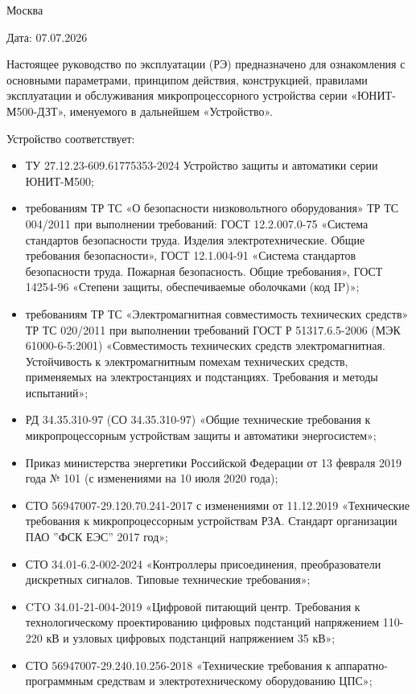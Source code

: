 \documentclass[a4paper, 12pt, table, hidelinks, DIV=calc]{extarticle}
\def\revdate{07.07.2026}
\def\colondevicetype{ЮНИТ-М500-ДЗТ}
\begin{document}
\vskip 3mm
\noindent
Москва
\hfill
\parbox{0.3\textwidth}{\raggedleft Дата: \textcolor{unigray}{\revdate}}
\vskip 5mm

\par
Настоящее руководство по эксплуатации (РЭ) предназначено для ознакомления с основными параметрами, принципом действия, конструкцией, правилами эксплуатации и обслуживания микропроцессорного устройства серии «\colondevicetype», именуемого в дальнейшем «Устройство».

\par
Устройство соответствует:
\begin{itemize}
\item ТУ 27.12.23-609.61775353-2024 Устройство защиты и автоматики серии ЮНИТ-М500;
\item требованиям ТР ТС «О безопасности низковольтного оборудования» ТР ТС 004/2011 при выполнении требований: ГОСТ 12.2.007.0-75 «Система стандартов безопасности труда. Изделия электротехнические. Общие требования безопасности», ГОСТ 12.1.004-91 «Система стандартов безопасности труда. Пожарная безопасность. Общие требования», ГОСТ 14254-96 «Степени защиты, обеспечиваемые оболочками (код IP)»; 
\item требованиям ТР ТС «Электромагнитная совместимость технических средств» ТР ТС 020/2011 при выполнении требований ГОСТ Р 51317.6.5-2006 (МЭК 61000-6-5:2001) «Совместимость технических средств электромагнитная. Устойчивость к электромагнитным помехам технических средств, применяемых на электростанциях и подстанциях. Требования и методы испытаний»;
\item РД 34.35.310-97 (СО 34.35.310-97) «Общие технические требования к микропроцессорным устройствам защиты и автоматики энергосистем»;
\item Приказ министерства энергетики Российской Федерации от 13 февраля 2019 года № 101 (с изменениями на 10 июля 2020 года);
\item СТО 56947007-29.120.70.241-2017 с изменениями от 11.12.2019 «Технические требования к микропроцессорным устройствам РЗА. Стандарт организации ПАО ''ФСК ЕЭС'' 2017 год»;
\item СТО 34.01-6.2-002-2024 «Контроллеры присоединения, преобразователи дискретных сигналов. Типовые технические требования»;
\item CTO 34.01-21-004-2019 «Цифровой питающий центр. Требования к технологическому проектированию цифровых подстанций напряжением 110-220 кВ и узловых цифровых подстанций напряжением 35 кВ»;
\item СТО 56947007-29.240.10.256-2018 «Технические требования к аппаратно-программным средствам и электротехническому оборудованию ЦПС»;

\end{itemize}
\end{document}
